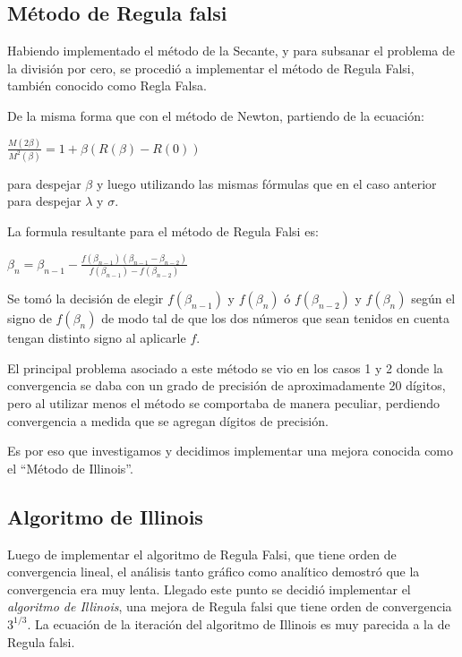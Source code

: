 \subsection{M\'etodo de Regula falsi}

Habiendo implementado el m\'etodo de la Secante, y para subsanar el problema 
de la divisi\'on por cero, se procedi\'o a implementar el m\'etodo de 
Regula Falsi, tambi\'en conocido como Regla Falsa.

De la misma forma que con el m\'etodo de Newton, partiendo de la ecuaci\'on:
\begin{center}

$\frac{M(2\beta)}{M^2(\beta)}=1 + \beta(R(\beta)-R(0))$\\
\end{center}

para despejar $\beta$ y luego utilizando las mismas f\'ormulas que en el 
caso anterior para despejar $\lambda$ y $\sigma$.

La formula resultante para el m\'etodo de Regula Falsi es:
\begin{center}

$\beta_n = \beta_{n-1} - \frac{f(\beta_{n-1}) (\beta_{n-1}-\beta_{n-2})}
{f(\beta_{n-1}) - f(\beta_{n-2})}$\\
\end{center}

Se tom\'o la decisi\'on de elegir $f(\beta_{n-1})$ y $f(\beta_n)$ \'o 
$f(\beta_{n-2})$ y $f(\beta_n)$ seg\'un el signo de $f(\beta_n)$ de modo 
tal de que los dos n\'umeros que sean tenidos en cuenta tengan distinto signo 
al aplicarle $f$.

El principal problema asociado a este m\'etodo se vio en los casos 1 y 2 donde
la convergencia se daba con un grado de precisi\'on de aproximadamente 20
d\'igitos, pero al utilizar menos el m\'etodo se comportaba de manera peculiar,
perdiendo convergencia a medida que se agregan d\'igitos de precisi\'on.

Es por eso que investigamos y decidimos implementar una mejora conocida como el
``M\'etodo de Illinois''.

\subsection{Algoritmo de Illinois}

Luego de implementar el algoritmo de Regula Falsi, que tiene orden de 
convergencia lineal, el an\'alisis tanto gr\'afico como anal\'itico demostr\'o
que la convergencia era muy lenta. 
Llegado este punto se decidi\'o implementar el \textit{algoritmo de Illinois}, una mejora
de Regula falsi que tiene orden de convergencia $3^{1/3}$. 
La ecuaci\'on de la iteraci\'on del algoritmo de Illinois es muy 
parecida a la de Regula falsi.


